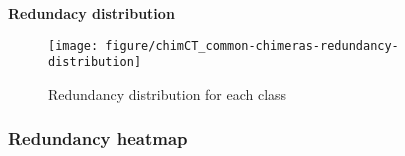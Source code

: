 \documentclass[a4paper]{article}
\begin{document}
\large{\bf Redundacy distribution}\\

\begin{knitrout}
\color{fgcolor}\begin{figure}[]


{\centering \texttt{[image: figure/chimCT\_common-chimeras-redundancy-distribution]} 

}

\caption[Redundancy distribution for each class]{Redundancy distribution for each class\label{fig:chimCT_common-chimeras-redundancy-distribution}}
\end{figure}


\end{knitrout}



\subsubsection{Redundancy heatmap}
\end{document}
